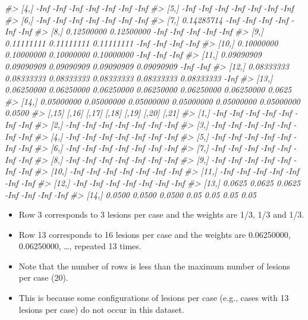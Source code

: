 \documentclass[]{book}
\newenvironment{Shaded}{\begin{snugshade}}{\end{snugshade}}
\newcommand{\CommentTok}[1]{\textcolor[rgb]{0.56,0.35,0.01}{\textit{#1}}}
\providecommand{\tightlist}{%
  \setlength{\itemsep}{0pt}\setlength{\parskip}{0pt}}
\begin{document}
\begin{Shaded}
\begin{Highlighting}[]
\CommentTok{#>  [4,]       -Inf       -Inf       -Inf       -Inf       -Inf       -Inf   -Inf}
\CommentTok{#>  [5,]       -Inf       -Inf       -Inf       -Inf       -Inf       -Inf   -Inf}
\CommentTok{#>  [6,]       -Inf       -Inf       -Inf       -Inf       -Inf       -Inf   -Inf}
\CommentTok{#>  [7,] 0.14285714       -Inf       -Inf       -Inf       -Inf       -Inf   -Inf}
\CommentTok{#>  [8,] 0.12500000 0.12500000       -Inf       -Inf       -Inf       -Inf   -Inf}
\CommentTok{#>  [9,] 0.11111111 0.11111111 0.11111111       -Inf       -Inf       -Inf   -Inf}
\CommentTok{#> [10,] 0.10000000 0.10000000 0.10000000 0.10000000       -Inf       -Inf   -Inf}
\CommentTok{#> [11,] 0.09090909 0.09090909 0.09090909 0.09090909 0.09090909       -Inf   -Inf}
\CommentTok{#> [12,] 0.08333333 0.08333333 0.08333333 0.08333333 0.08333333 0.08333333   -Inf}
\CommentTok{#> [13,] 0.06250000 0.06250000 0.06250000 0.06250000 0.06250000 0.06250000 0.0625}
\CommentTok{#> [14,] 0.05000000 0.05000000 0.05000000 0.05000000 0.05000000 0.05000000 0.0500}
\CommentTok{#>        [,15]  [,16]  [,17] [,18] [,19] [,20] [,21]}
\CommentTok{#>  [1,]   -Inf   -Inf   -Inf  -Inf  -Inf  -Inf  -Inf}
\CommentTok{#>  [2,]   -Inf   -Inf   -Inf  -Inf  -Inf  -Inf  -Inf}
\CommentTok{#>  [3,]   -Inf   -Inf   -Inf  -Inf  -Inf  -Inf  -Inf}
\CommentTok{#>  [4,]   -Inf   -Inf   -Inf  -Inf  -Inf  -Inf  -Inf}
\CommentTok{#>  [5,]   -Inf   -Inf   -Inf  -Inf  -Inf  -Inf  -Inf}
\CommentTok{#>  [6,]   -Inf   -Inf   -Inf  -Inf  -Inf  -Inf  -Inf}
\CommentTok{#>  [7,]   -Inf   -Inf   -Inf  -Inf  -Inf  -Inf  -Inf}
\CommentTok{#>  [8,]   -Inf   -Inf   -Inf  -Inf  -Inf  -Inf  -Inf}
\CommentTok{#>  [9,]   -Inf   -Inf   -Inf  -Inf  -Inf  -Inf  -Inf}
\CommentTok{#> [10,]   -Inf   -Inf   -Inf  -Inf  -Inf  -Inf  -Inf}
\CommentTok{#> [11,]   -Inf   -Inf   -Inf  -Inf  -Inf  -Inf  -Inf}
\CommentTok{#> [12,]   -Inf   -Inf   -Inf  -Inf  -Inf  -Inf  -Inf}
\CommentTok{#> [13,] 0.0625 0.0625 0.0625  -Inf  -Inf  -Inf  -Inf}
\CommentTok{#> [14,] 0.0500 0.0500 0.0500  0.05  0.05  0.05  0.05}
\end{Highlighting}
\end{Shaded}

\begin{itemize}
\tightlist
\item
  Row 3 corresponds to 3 lesions per case and the weights are 1/3, 1/3 and 1/3.
\item
  Row 13 corresponds to 16 lesions per case and the weights are 0.06250000, 0.06250000, \ldots{}, repeated 13 times.
\item
  Note that the number of rows is less than the maximum number of lesions per case (20).
\item
  This is because some configurations of lesions per case (e.g., cases with 13 lesions per case) do not occur in this dataset.
\end{itemize}
\end{document}
